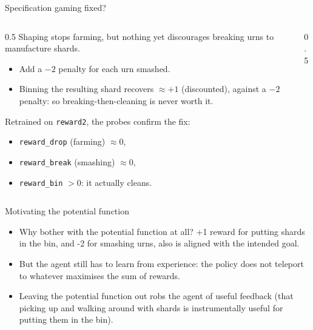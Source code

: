 \begin{frame}[t]{Specification gaming fixed?}
\begin{columns}[T]
\begin{column}{0.5\textwidth}
Shaping stops farming, but nothing yet discourages breaking urns to manufacture shards.
\begin{itemize}
  \item Add a $-2$ penalty for each urn smashed.
  \item Binning the resulting shard recovers $\approx +1$ (discounted), against a $-2$ penalty: 
  so breaking-then-cleaning is never worth it.
\end{itemize}
Retrained on \texttt{reward2}, the probes confirm the fix:
\begin{itemize}
  \item \texttt{reward\_drop} (farming) $\approx 0$,
  \item \texttt{reward\_break} (smashing) $\approx 0$,
  \item \texttt{reward\_bin} $> 0$: it actually cleans.
\end{itemize}


\end{column}
\begin{column}{0.5\textwidth}
\centering
{}\\[1ex]
\raggedright\footnotesize

\end{column}
\end{columns}
\end{frame}


\begin{frame}{Motivating the potential function}
\begin{itemize}
  \item Why bother with the potential function at all? +1 reward for putting shards in
  the bin, and -2 for smashing urns, also is aligned with the intended goal.
  \pause
  \item But the agent still has to learn from experience: the policy does not
  teleport to whatever maximises the sum of rewards.
  \pause
  \item Leaving the potential function out robs the agent of useful feedback (that picking up
  and walking around with shards is instrumentally useful for putting them in the bin).
\end{itemize}
\end{frame}


